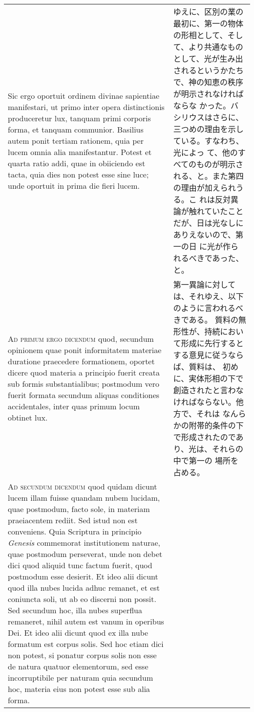 \documentclass[10pt]{jsarticle} %
\begin{document}
\begin{longtable}{p{21em}p{21em}}
\\


 Sic ergo oportuit ordinem divinae sapientiae
manifestari, ut primo inter opera distinctionis produceretur lux,
tanquam primi corporis forma, et tanquam communior. Basilius autem ponit
tertiam rationem, quia per lucem omnia alia manifestantur. Potest et
quarta ratio addi, quae in obiiciendo est tacta, quia dies non potest
esse sine luce; unde oportuit in prima die fieri lucem.

&


ゆえに、区別の業の最初に、第一の物体の形相として、そして、より共通なもの
 として、光が生み出されるというかたちで、神の知恵の秩序が明示されなければならな
 かった。バシリウスはさらに、三つめの理由を示している。すなわち、光によっ
 て、他のすべてのものが明示される、と。また第四の理由が加えられうる。こ
 れは反対異論が触れていたことだが、日は光なしにありえないので、第一の日
 に光が作られるべきであった、と。


\\


{\scshape Ad primum ergo dicendum} quod, secundum
opinionem quae ponit informitatem materiae duratione praecedere
formationem, oportet dicere quod materia a principio fuerit creata sub
formis substantialibus; postmodum vero fuerit formata secundum aliquas
conditiones accidentales, inter quas primum locum obtinet lux.

&

第一異論に対しては、それゆえ、以下のように言われるべきである。
質料の無形性が、持続において形成に先行するとする意見に従うならば、質料は、
 初めに、実体形相の下で創造されたと言わなければならない。他方で、それは
 なんらかの附帯的条件の下で形成されたのであり、光は、それらの中で第一の
 場所を占める。

\\


{\scshape Ad secundum dicendum} quod quidam dicunt lucem
illam fuisse quandam nubem lucidam, quae postmodum, facto sole, in
materiam praeiacentem rediit. Sed istud non est conveniens. Quia
Scriptura in principio {\itshape Genesis} commemorat institutionem naturae, quae
postmodum perseverat, unde non debet dici quod aliquid tunc factum
fuerit, quod postmodum esse desierit. Et ideo alii dicunt quod illa
nubes lucida adhuc remanet, et est coniuncta soli, ut ab eo discerni non
possit. Sed secundum hoc, illa nubes superflua remaneret, nihil autem
est vanum in operibus Dei. Et ideo alii dicunt quod ex illa nube
formatum est corpus solis. Sed hoc etiam dici non potest, si ponatur
corpus solis non esse de natura quatuor elementorum, sed esse
incorruptibile per naturam quia secundum hoc, materia eius non potest
esse sub alia forma. 




\end{longtable}
\end{document}
